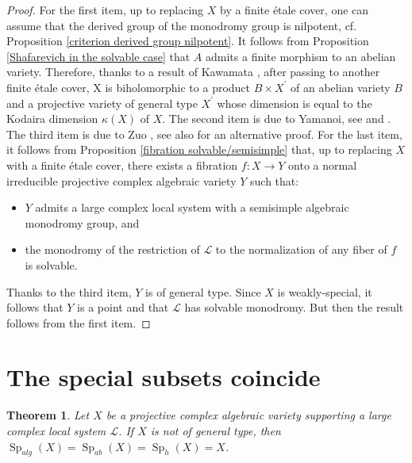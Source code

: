 \documentclass[11pt,letterpaper]{amsart}
\def\cL{\mathcal{L}}
\theoremstyle{plain}
\newtheorem{thm}{Theorem}[section]
\DeclareMathOperator{\Sp}{Sp}
\begin{document}
\begin{proof}
For the first item, up to replacing $X$ by a finite étale cover, one can assume that the derived group of the monodromy group is nilpotent, cf. Proposition \ref{criterion derived group nilpotent}. It follows from Proposition \ref{Shafarevich in the solvable case} that $A$ admits a finite morphism to an abelian variety. Therefore, thanks to a result of Kawamata \cite[Theorem 13]{Kawamata-characterization}, after passing to another finite étale cover, X is biholomorphic to a product $B \times X^\prime$ of an abelian variety $B$ and a projective variety of general type $X^\prime$ whose dimension is equal to the Kodaira dimension $\kappa(X)$ of $X$. The second item is due to Yamanoi, see \cite{Yamanoi-Fourier} and \cite[Theorem 2.17]{Yamanoi-lectures}. The third item is due to Zuo \cite{Zuo-Chern-hyperbolicity}, see also \cite[Théorème 6.3]{CCE} for an alternative proof. For the last item, it follows from Proposition \ref{fibration solvable/semisimple} that, up to replacing $X$ with a finite étale cover, there exists a fibration $f \colon X \to Y$ onto a normal irreducible projective complex algebraic variety $Y$ such that:
\begin{itemize}
\item $Y$ admits a large complex local system with a semisimple algebraic monodromy group, and
\item the monodromy of the restriction of $\cL$ to the normalization of any fiber of $f$ is solvable.
\end{itemize} 
Thanks to the third item, $Y$ is of general type. Since $X$ is weakly-special, it follows that $Y$ is a point and that $\cL$ has solvable monodromy. But then the result follows from the first item.
\end{proof}


\section{The special subsets coincide}

\begin{thm}\label{Special sets of not general type varieties}
Let $X$ be a projective complex algebraic variety supporting a large complex local system $\cL$. If $X$ is not of general type, then $ \Sp_{alg}(X) = \Sp_{ab}(X) = \Sp_h(X) = X$.
\end{thm}
\end{document}
